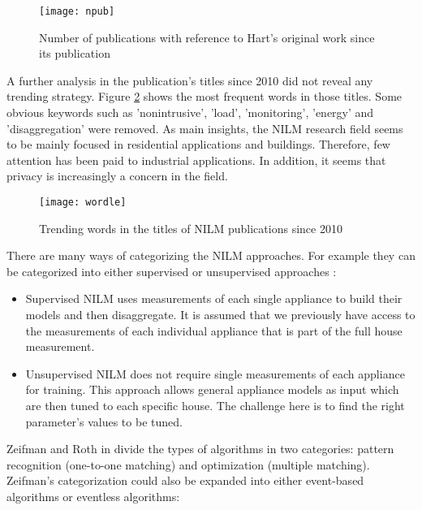 \begin{figure}[bt]
    \centering
    \texttt{[image: npub]}
    \caption{Number of publications with reference to Hart's original work since its publication}
    \label{1npub}
\end{figure}


A further analysis in the publication's titles since 2010 did not reveal any trending strategy. Figure \ref{wordle} shows the most frequent words in those titles. Some obvious keywords such as 'nonintrusive', 'load', 'monitoring', 'energy' and 'disaggregation' were removed. As main insights, the NILM research field seems to be mainly focused in residential applications and buildings. Therefore, few attention has been paid to industrial applications. In addition, it seems that privacy is increasingly a concern in the field.

\begin{figure}[bt]
    \centering
    \texttt{[image: wordle]}
    \caption{Trending words in the titles of NILM publications since 2010}
    \label{wordle}
\end{figure}

There are many ways of categorizing the NILM approaches. For example they can be categorized into either supervised or unsupervised approaches \cite{makonin2016}:

\begin{itemize}
    \item Supervised NILM uses measurements of each single appliance to build their models and then disaggregate. It is assumed that we previously have access to the measurements of each individual appliance that is part of the full house measurement. 
    \item Unsupervised NILM does not require single measurements of each appliance for training. This approach allows general appliance models as input which are then tuned to each specific house. The challenge here is to find the right parameter's values to be tuned. 
\end{itemize}

Zeifman and Roth in \cite{zeifman} divide the types of algorithms in two categories: pattern recognition (one-to-one matching) and optimization (multiple matching). Zeifman's categorization could also be expanded into either event-based algorithms or eventless algorithms:

